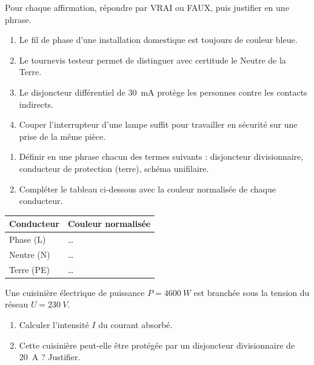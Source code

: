 \documentclass[11pt]{article}
\newcommand{\cle}[1]{{\popxbold\color{popdark}#1}}
\begin{document}
\begin{exercice}
Pour chaque affirmation, répondre par VRAI ou FAUX, puis justifier en une phrase.
\begin{enumerate}
\item Le fil de phase d'une installation domestique est toujours de couleur bleue.
\item Le tournevis testeur permet de distinguer avec certitude le Neutre de la Terre.
\item Le disjoncteur différentiel de \SI{30}{mA} protège les personnes contre les contacts indirects.
\item Couper l'interrupteur d'une lampe suffit pour travailler en sécurité sur une prise de la même pièce.
\end{enumerate}
\end{exercice}

\begin{exercice}
\begin{enumerate}
\item Définir en une phrase chacun des termes suivants : \cle{disjoncteur divisionnaire}, \cle{conducteur de protection (terre)}, \cle{schéma unifilaire}.
\item Compléter le tableau ci-dessous avec la couleur normalisée de chaque conducteur.
\end{enumerate}
\begin{center}
\begin{tabularx}{\linewidth}{|l|X|}
\hline
\rowcolor{popblueL} \textbf{Conducteur} & \textbf{Couleur normalisée} \\
\hline
Phase (L) & \ldots \\
\hline
Neutre (N) & \ldots \\
\hline
Terre (PE) & \ldots \\
\hline
\end{tabularx}
\end{center}
\end{exercice}

\begin{exercice}
Une cuisinière électrique de puissance $P = \SI{4600}{W}$ est branchée sous la tension du réseau $U = \SI{230}{V}$.
\begin{enumerate}
\item Calculer l'intensité $I$ du courant absorbé.
\item Cette cuisinière peut-elle être protégée par un disjoncteur divisionnaire de \SI{20}{A} ? Justifier.
\end{enumerate}
\end{exercice}
\end{document}

